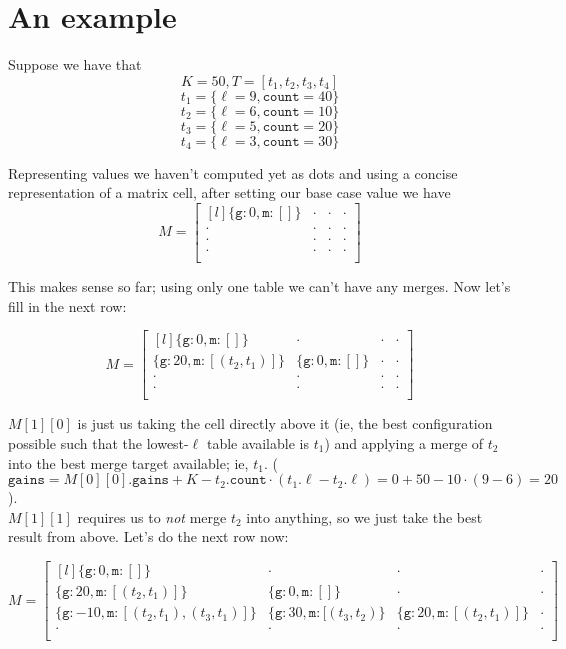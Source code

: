 \documentclass{article}[12]
\begin{document}
\section{An example}
Suppose we have that
$$K = 50, T = [ t_1, t_2, t_3, t_4 ]$$
$$t_1 = \{ \ell = 9, \texttt{count} = 40 \}$$
$$t_2 = \{ \ell = 6, \texttt{count} = 10 \}$$
$$t_3 = \{ \ell = 5, \texttt{count} = 20 \}$$
$$t_4 = \{ \ell = 3, \texttt{count} = 30 \}$$

Representing values we haven't computed yet as dots and using a concise representation of a matrix cell, after setting our base case value we have
\[ M = \begin{bmatrix*}[l]
\{ \texttt{g}: 0, \texttt{m}: []\} & \cdot & \cdot & \cdot\\
\cdot & \cdot & \cdot & \cdot\\
\cdot & \cdot & \cdot & \cdot\\
\cdot & \cdot & \cdot & \cdot\\
\end{bmatrix*} \]

This makes sense so far; using only one table we can't have any merges. Now let's fill in the next row:

\[ M = \begin{bmatrix*}[l]
\{ \texttt{g}: 0, \texttt{m}: []\} & \cdot & \cdot & \cdot\\
\{ \texttt{g}: 20, \texttt{m}: [(t_2, t_1)]\} & \{ \texttt{g}: 0, \texttt{m}: []\} & \cdot & \cdot\\
\cdot & \cdot & \cdot & \cdot\\
\cdot & \cdot & \cdot & \cdot\\
\end{bmatrix*} \]

$M[1][0]$ is just us taking the cell directly above it (ie, the best configuration possible such that the lowest-$\ell$ table available is $t_1$) and applying a merge of $t_2$ into the best merge target available; ie, $t_1$. ($\texttt{gains} = M[0][0].\texttt{gains} + K - t_2.\texttt{count} \cdot (t_1.\ell - t_2.\ell) = 0 + 50 - 10 \cdot (9 - 6) = 20$).\\

$M[1][1]$ requires us to \textit{not} merge $t_2$ into anything, so we just take the best result from above. Let's do the next row now:

\[ M = \begin{bmatrix*}[l]
\{ \texttt{g}: 0, \texttt{m}: []\} & \cdot & \cdot & \cdot\\
\{ \texttt{g}: 20, \texttt{m}: [(t_2, t_1)]\} & \{ \texttt{g}: 0, \texttt{m}: []\} & \cdot & \cdot\\
\{ \texttt{g}: -10, \texttt{m}: [(t_2, t_1), (t_3, t_1)]\} & \{ \texttt{g}: 30, \texttt{m}: [(t_3, t_2)\} & \{ \texttt{g}: 20, \texttt{m}: [(t_2, t_1)]\} & \cdot\\
\cdot & \cdot & \cdot & \cdot\\
\end{bmatrix*} \]
\end{document}
